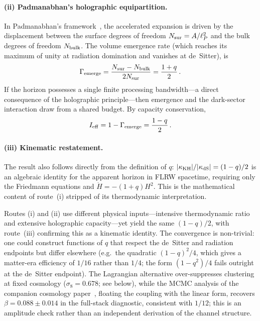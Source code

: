 \documentclass[aps,prd,twocolumn,10pt,superscriptaddress,nofootinbib]{revtex4-2}
\begin{document}
\paragraph{(ii) Padmanabhan's holographic equipartition.}
In Padmanabhan's framework~\cite{Padmanabhan2010,Padmanabhan2012}, the accelerated
expansion is driven by the displacement between the surface degrees
of freedom $N_{\rm sur} = A/\ell_P^2$ and the bulk degrees of
freedom $N_{\rm bulk}$.  The volume emergence rate (which reaches its maximum of unity
at radiation domination and vanishes at de~Sitter), is
\begin{equation}
\Gamma_{\rm emerge} = \frac{N_{\rm sur} - N_{\rm bulk}}{2N_{\rm sur}}
  = \frac{1+q}{2}\,.
\label{eq:Gamma_emerge}
\end{equation}
If the horizon possesses a single finite processing
bandwidth---a direct consequence of the holographic principle---then
emergence and the dark-sector interaction draw from a shared budget.
By capacity conservation,
\begin{equation}
I_{\rm eff} = 1 - \Gamma_{\rm emerge} = \frac{1-q}{2}\,.
\label{eq:Ieff_padmanabhan}
\end{equation}

\paragraph{(iii) Kinematic restatement.}
The result also follows directly from the definition of $q$:
$|\kappa_{\rm KH}|/|\kappa_{\rm dS}| = (1-q)/2$ is an algebraic identity
for the apparent horizon in FLRW spacetime, requiring only the
Friedmann equations and $\dot{H} = -(1+q)H^2$.  This is
the mathematical content of route~(i) stripped of its
thermodynamic interpretation.

Routes (i) and (ii) use different physical
inputs---intensive thermodynamic ratio and extensive holographic
capacity---yet yield the same $(1-q)/2$, with route~(iii)
confirming this as a kinematic identity.
The convergence is non-trivial: one could construct functions of $q$
that respect the de~Sitter and radiation endpoints but differ
elsewhere (e.g.\ the quadratic $(1-q)^2/4$, which gives a
matter-era efficiency of $1/16$ rather than $1/4$; the form
$(1-q^2)/4$ fails outright at the de~Sitter endpoint).  The Lagrangian alternative over-suppresses
clustering at fixed cosmology ($\sigma_8 = 0.678$; see below),
while the MCMC analysis of the companion cosmology paper~\cite{Sayegh2026}, floating the
coupling with the linear form, recovers $\beta = 0.088 \pm 0.014$ in the full-stack diagnostic,
consistent with $1/12$; this is an amplitude check rather than an
independent derivation of the channel structure.
\end{document}
